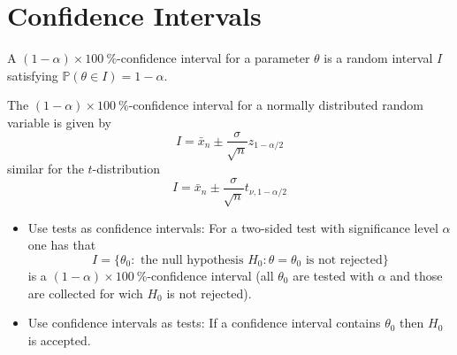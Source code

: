 \section{Confidence Intervals}
A $(1-\alpha)\times 100\:\%$-confidence interval for a parameter $\theta$ is a random interval $I$ satisfying $\mathbb{P}(\theta\in I)=1-\alpha$.

The $(1-\alpha)\times 100\:\%$-confidence interval for a normally distributed random variable is given by
\begin{equation*}
    I=\bar{x}_n \pm \frac{\sigma}{\sqrt{n}}z_{1-\alpha/2}
\end{equation*}
similar for the $t$-distribution
\begin{equation*}
    I=\bar{x}_n \pm \frac{\sigma}{\sqrt{n}}t_{\nu,1-\alpha/2}
\end{equation*}

\newpar{}

\begin{itemize}
    \item Use tests as confidence intervals: For a two-sided test with significance level $\alpha$ one has that
    \begin{equation*}
        I=\{\theta_0:\text{ the null hypothesis }H_0\colon\theta=\theta_0\text{ is not rejected}\}
    \end{equation*}
    is a $(1-\alpha)\times 100\:\%$-confidence interval (all $\theta_0$ are tested with $\alpha$ and those are collected for wich $H_0$ is not rejected).
    \item Use confidence intervals as tests: If a confidence interval contains $\theta_0$ then $H_0$ is accepted.
\end{itemize}





